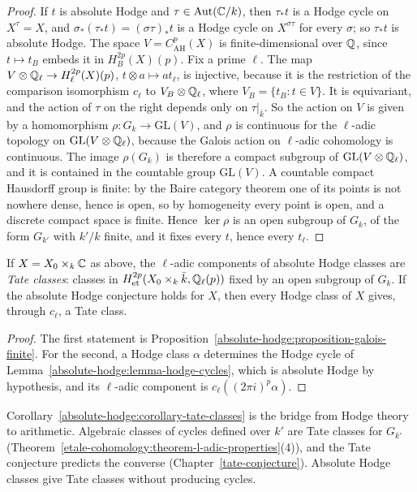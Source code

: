 \begin{proof}
If $t$ is absolute Hodge and $\tau \in \mathrm{Aut}(\mathbb{C}/k)$, then $\tau_*t$ is a Hodge cycle on $X^\tau = X$, and $\sigma_*(\tau_*t) = (\sigma\tau)_*t$ is a Hodge cycle on $X^{\sigma\tau}$ for every $\sigma$; so $\tau_*t$ is
absolute Hodge. The space $V = C^p_{\mathrm{AH}}(X)$ is finite-dimensional over $\mathbb{Q}$, since $t \mapsto t_B$ embeds it in $H^{2p}_B(X)(p)$. Fix a prime $\ell$. The map $V \otimes \mathbb{Q}_\ell \to H^{2p}_\ell(X)(p)$,
$t \otimes a \mapsto at_\ell$, is injective, because it is the restriction of the comparison isomorphism $c_\ell$ to $V_B \otimes \mathbb{Q}_\ell$, where $V_B = \{t_B : t \in V\}$. It is equivariant, and the action of
$\tau$ on the right depends only on $\tau|_{\bar k}$. So the action on $V$ is given by a homomorphism $\rho \colon G_k \to \mathrm{GL}(V)$, and $\rho$ is continuous for the $\ell$-adic topology on
$\mathrm{GL}(V \otimes \mathbb{Q}_\ell)$, because the Galois action on $\ell$-adic cohomology is continuous. The image $\rho(G_k)$ is therefore a compact subgroup of $\mathrm{GL}(V \otimes \mathbb{Q}_\ell)$, and it is contained in
the countable group $\mathrm{GL}(V)$. A countable compact Hausdorff group is finite: by the Baire category theorem one of its points is not nowhere dense, hence is open, so by homogeneity every
point is open, and a discrete compact space is finite. Hence $\ker\rho$ is an open subgroup of $G_k$, of the form $G_{k'}$ with $k'/k$ finite, and it fixes every $t$, hence every $t_\ell$.
\end{proof}

\begin{corollary}\label{absolute-hodge:corollary-tate-classes}
If $X = X_0 \times_k\mathbb{C}$ as above, the $\ell$-adic components of absolute Hodge classes are \emph{Tate classes}: classes in $H^{2p}_{\mathrm{et}}(X_0 \times_k\bar k, \mathbb{Q}_\ell(p))$ fixed by an open subgroup
of $G_k$. If the absolute Hodge conjecture holds for $X$, then every Hodge class of $X$ gives, through $c_\ell$, a Tate class.
\end{corollary}

\begin{proof}
The first statement is Proposition~\ref{absolute-hodge:proposition-galois-finite}. For the second, a Hodge class $\alpha$ determines the Hodge cycle of Lemma~\ref{absolute-hodge:lemma-hodge-cycles}, which is
absolute Hodge by hypothesis, and its $\ell$-adic component is $c_\ell((2\pi i)^p\alpha)$.
\end{proof}

\begin{remark}\label{absolute-hodge:remark-hodge-to-tate}
Corollary~\ref{absolute-hodge:corollary-tate-classes} is the bridge from Hodge theory to arithmetic. Algebraic classes of cycles defined over $k'$ are Tate classes for $G_{k'}$
(Theorem~\ref{etale-cohomology:theorem-l-adic-properties}(4)), and the Tate conjecture predicts the converse (Chapter~\ref{tate-conjecture}). Absolute Hodge classes give Tate classes without
producing cycles.
\end{remark}

